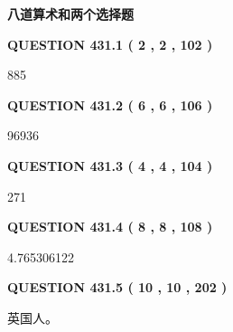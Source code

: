 \documentclass{ctexart}
\begin{document}
   
   
   
 \vspace{0.2in}
{\LARGE {\textbf{ 八道算术和两个选择题}}}
   
   
  
\vspace{0.2in}
  
{\textbf{\Large{QUESTION
431.1 
 ( 2 , 2 , 102 )
}}}
  
  
 
 
\noindent{}

885
 
 
  
\vspace{0.2in}
  
{\textbf{\Large{QUESTION
431.2 
 ( 6 , 6 , 106 )
}}}
  
  
 
 
\noindent{}

96936
 
 
  
\vspace{0.2in}
  
{\textbf{\Large{QUESTION
431.3 
 ( 4 , 4 , 104 )
}}}
  
  
 
 
\noindent{}

271
 
 
  
\vspace{0.2in}
  
{\textbf{\Large{QUESTION
431.4 
 ( 8 , 8 , 108 )
}}}
  
  
 
 
\noindent{}

4.765306122
 
 
  
\vspace{0.2in}
  
{\textbf{\Large{QUESTION
431.5 
 ( 10 , 10 , 202 )
}}}
  
  
 
 
\noindent{}
 
 
英国人。
 
 
 
\end{document}
